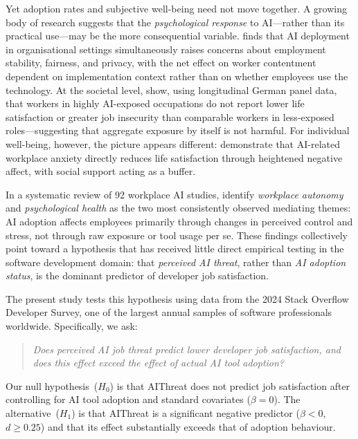 \documentclass[11pt]{article}
\begin{document}
Yet adoption rates and subjective well-being need not move together.
A growing body of research suggests that the \emph{psychological response} to
AI—rather than its practical use—may be the more consequential variable.
\citet{sadeghi2024employee} finds that AI deployment in organisational
settings simultaneously raises concerns about employment stability, fairness,
and privacy, with the net effect on worker contentment dependent on
implementation context rather than on whether employees use the technology.
At the societal level, \citet{giuntella2025ai} show, using longitudinal German
panel data, that workers in highly AI-exposed occupations do not report lower
life satisfaction or greater job insecurity than comparable workers in
less-exposed roles—suggesting that aggregate exposure by itself is not harmful.
For individual well-being, however, the picture appears different: \citet{feng2025ai}
demonstrate that AI-related workplace anxiety directly reduces life satisfaction
through heightened negative affect, with social support acting as a buffer.

In a systematic review of 92 workplace AI studies,
\citet{soulami2024exploring} identify \emph{workplace autonomy} and
\emph{psychological health} as the two most consistently observed mediating
themes: AI adoption affects employees primarily through changes in perceived
control and stress, not through raw exposure or tool usage per se.
These findings collectively point toward a hypothesis that has received
little direct empirical testing in the software development domain:
that \emph{perceived AI threat}, rather than \emph{AI adoption status},
is the dominant predictor of developer job satisfaction.

The present study tests this hypothesis using data from the 2024 Stack
Overflow Developer Survey, one of the largest annual samples of software
professionals worldwide. Specifically, we ask:

\begin{quote}
\textit{Does perceived AI job threat predict lower developer job satisfaction,
and does this effect exceed the effect of actual AI tool adoption?}
\end{quote}

Our null hypothesis~($H_0$) is that AIThreat does not predict job satisfaction
after controlling for AI tool adoption and standard covariates ($\beta = 0$).
The alternative~($H_1$) is that AIThreat is a significant negative predictor
($\beta < 0$, $d \geq 0.25$) and that its effect substantially exceeds that
of adoption behaviour.
\end{document}
